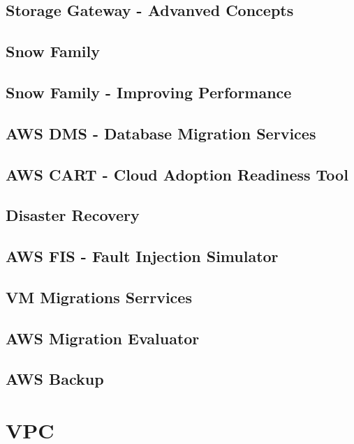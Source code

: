 \documentclass[11pt]{book}
\begin{document}
    \section{Storage Gateway - Advanved Concepts}


    \section{Snow Family}


    \section{Snow Family - Improving Performance}


    \section{AWS DMS - Database Migration Services}


    \section{AWS CART - Cloud Adoption Readiness Tool}


    \section{Disaster Recovery}


    \section{AWS FIS - Fault Injection Simulator}


    \section{VM Migrations Serrvices}


    \section{AWS Migration Evaluator}


    \section{AWS Backup}


    \chapter{VPC}
\end{document}
